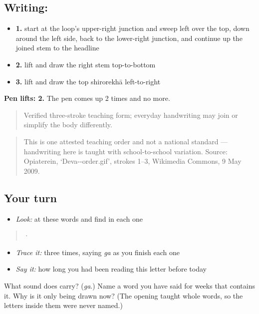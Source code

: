 \subsection*{Writing: }

\begin{itemize}
\raggedright
  \item \textbf{1.} start at the loop's upper-right junction and sweep left over the top, down around the left side, back to the lower-right junction, and continue up the joined stem to the headline
  \item \textbf{2.} lift and draw the right stem top-to-bottom
  \item \textbf{3.} lift and draw the top shirorekhā left-to-right
\end{itemize}

\textbf{Pen lifts: 2.} The pen comes up 2 times and no more.

\begin{quote}
Verified three-stroke teaching form; everyday handwriting may join or simplify the body differently.
\end{quote}

\begin{quote}
This is one attested teaching order and not a national standard — handwriting here is taught with school-to-school variation. Source: Opiaterein, ‘Deva--order.gif’, strokes 1–3, Wikimedia Commons, 9 May 2009.
\end{quote}

\subsection*{Your turn}
\begin{itemize}
\raggedright
  \item \emph{Look:} at these words and find  in each one
\end{itemize}

\begin{quote}
  ·  
\end{quote}

\begin{itemize}
\raggedright
  \item \emph{Trace it:}  three times, saying \emph{ga} as you finish each one
  \item \emph{Say it:} how long you had been reading this letter before today
\end{itemize}

\begin{tcolorbox}[breakable,colback=teal!4,colframe=teal!35!black,title={Before you move on}]
What sound does \textbf{} carry? (\emph{ga}.) Name a word you have said for weeks that contains it. Why is it only being drawn now? (The opening taught whole words, so the letters inside them were never named.)
\end{tcolorbox}
